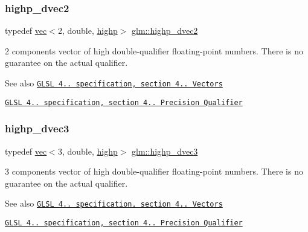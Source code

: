 \subsubsection{\texorpdfstring{highp\+\_\+dvec2}{highp\_dvec2}}
{\footnotesize\ttfamily typedef \hyperlink{structglm_1_1vec}{vec}$<$2, double, \hyperlink{namespaceglm_a36ed105b07c7746804d7fdc7cc90ff25ac6f7eab42eacbb10d59a58e95e362074}{highp}$>$ \hyperlink{group__core__precision_gadec51e8e57b72d8fc95e87f18d1ad4dd}{glm\+::highp\+\_\+dvec2}}

2 components vector of high double-\/qualifier floating-\/point numbers. There is no guarantee on the actual qualifier.

\begin{DoxySeeAlso}{See also}
\href{http://www.opengl.org/registry/doc/GLSLangSpec.4.20.8.pdf}{\tt G\+L\+SL 4.. specification, section 4.. Vectors} 

\href{http://www.opengl.org/registry/doc/GLSLangSpec.4.20.8.pdf}{\tt G\+L\+SL 4.. specification, section 4.. Precision Qualifier} 
\end{DoxySeeAlso}
\mbox{\label{group__core__precision_ga63f89fa26f599ac15428c9d1a70a5467}} 
\subsubsection{\texorpdfstring{highp\+\_\+dvec3}{highp\_dvec3}}
{\footnotesize\ttfamily typedef \hyperlink{structglm_1_1vec}{vec}$<$3, double, \hyperlink{namespaceglm_a36ed105b07c7746804d7fdc7cc90ff25ac6f7eab42eacbb10d59a58e95e362074}{highp}$>$ \hyperlink{group__core__precision_ga63f89fa26f599ac15428c9d1a70a5467}{glm\+::highp\+\_\+dvec3}}

3 components vector of high double-\/qualifier floating-\/point numbers. There is no guarantee on the actual qualifier.

\begin{DoxySeeAlso}{See also}
\href{http://www.opengl.org/registry/doc/GLSLangSpec.4.20.8.pdf}{\tt G\+L\+SL 4.. specification, section 4.. Vectors} 

\href{http://www.opengl.org/registry/doc/GLSLangSpec.4.20.8.pdf}{\tt G\+L\+SL 4.. specification, section 4.. Precision Qualifier} 
\end{DoxySeeAlso}
\mbox{\label{group__core__precision_ga6e8645fa38f0260e57f1fb7555de0c2f}} 
